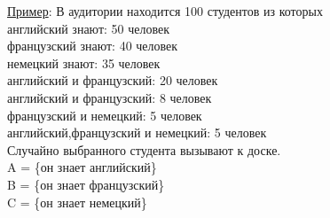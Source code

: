 \underline{Пример}: В аудитории находится 100 студентов из которых \\
английский знают: 50 человек \\
французский знают: 40 человек \\
немецкий знают: 35 человек \\

английский и французский: 20 человек \\
английский и французский: 8 человек \\
французский и немецкий: 5 человек \\

английский,французский и немецкий: 5 человек \\

Случайно выбранного студента вызывают к доске. \\
A = \{он знает английский\} \\
B = \{он знает французский\} \\
C = \{он знает немецкий\} \\

